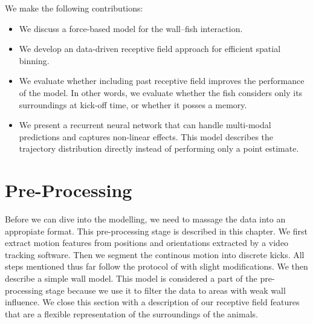 \documentclass[nobib, a4paper]{tufte-handout}
\begin{document}
We make the following contributions:
\begin{itemize}
\item We discuss a force-based model for the wall--fish interaction.
\item We develop an data-driven receptive field approach for efficient spatial binning.
\item We evaluate whether including past receptive field improves the performance of the model.
  In other words, we evaluate whether the fish considers only its surroundings at kick-off time, or whether it posses a memory.
\item We present a recurrent neural network that can handle multi-modal predictions and captures non-linear effects.
  This model describes the trajectory distribution directly instead of performing only a point estimate.
\end{itemize}

\section{Pre-Processing}
Before we can dive into the modelling, we need to massage the data into an appropiate format.
This pre-processing stage is described in this chapter.
We first extract motion features from positions and orientations extracted by a video tracking software.
Then we segment the continous motion into discrete kicks.
All steps mentioned thus far follow the protocol of \citeauthor{calovi}\autocite{calovi} with slight modifications.
We then describe a simple wall model.
This model is considered a part of the pre-processing stage because we use it to filter the data to areas with weak wall influence.
We close this section with a description of our receptive field features that are a flexible representation of the surroundings of the animals.
\end{document}
